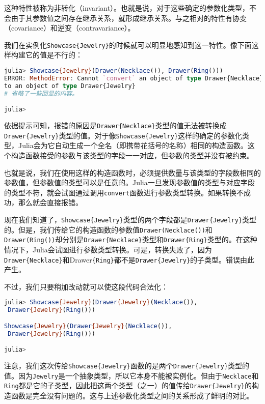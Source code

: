 这种特性被称为非转化（invariant）。也就是说，对于这些确定的参数化类型，不会由于其参数值之间存在继承关系，就形成继承关系。与之相对的特性有协变（covariance）和逆变（contravariance）。

我们在实例化\verb|Showcase{Jewelry}|的时候就可以明显地感知到这一特性。像下面这样构建它的值是不行的：
\begin{lstlisting}[language=julia]
julia> Showcase{Jewelry}(Drawer(Necklace()), Drawer(Ring()))
ERROR: MethodError: Cannot `convert` an object of type Drawer{Necklace} 
to an object of type Drawer{Jewelry}
# 省略了一些回显的内容。

julia> 
\end{lstlisting}

依据提示可知，报错的原因是\verb|Drawer{Necklace}|类型的值无法被转换成\verb|Drawer{Jewelry}|类型的值。对于像\verb|Showcase{Jewelry}|这样的确定的参数化类型，Julia会为它自动生成一个全名（即携带花括号的名称）相同的构造函数。这个构造函数接受的参数与该类型的字段一一对应，但参数的类型并没有被约束。

也就是说，我们在使用这样的构造函数时，必须提供数量与该类型的字段数相同的参数值，但参数值的类型可以是任意的。Julia一旦发现参数值的类型与对应字段的类型不符，就会试图通过调用\verb|convert|函数进行参数类型转换。如果转换不成功，那么就会直接报错。

现在我们知道了，\verb|Showcase{Jewelry}|类型的两个字段都是\verb|Drawer{Jewelry}|类型的。但是，我们传给它的构造函数的参数值\verb|Drawer(Necklace())|和\verb|Drawer(Ring())|却分别是\verb|Drawer{Necklace}|类型和\verb|Drawer{Ring}|类型的。在这种情况下，Julia会试图进行参数类型转换。可是，转换失败了，因为\verb|Drawer{Necklace}|和Drawer\verb|{Ring}|都不是\verb|Drawer{Jewelry}|的子类型。错误由此产生。

不过，我们只要稍加改动就可以使这段代码合法化：
\begin{lstlisting}[language=julia]
julia> Showcase{Jewelry}(Drawer{Jewelry}(Necklace()),
 Drawer{Jewelry}(Ring()))

Showcase{Jewelry}(Drawer{Jewelry}(Necklace()),
 Drawer{Jewelry}(Ring()))

julia> 
\end{lstlisting}

注意，我们这次传给\verb|Showcase{Jewelry}|函数的是两个\verb|Drawer{Jewelry}|类型的值。因为\verb|Jewelry|是一个抽象类型，所以它本身不能被实例化。但由于\verb|Necklace|和\verb|Ring|都是它的子类型，因此把这两个类型（之一）的值传给\verb|Drawer{Jewelry}|的构造函数是完全没有问题的。这与上述参数化类型之间的关系形成了鲜明的对比。

